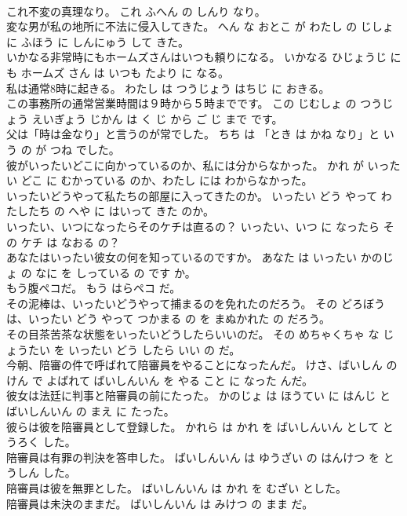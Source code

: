 \documentclass[8pt]{extreport}
\begin{document}
\begin{CJK}{UTF8}{min}
\\	これ不変の真理なり。	これ ふへん の しんり なり。	
\\	変な男が私の地所に不法に侵入してきた。	へん な おとこ が わたし の じしょ に ふほう に しんにゅう して きた。	
\\	いかなる非常時にもホームズさんはいつも頼りになる。	いかなる ひじょうじ にも ホームズ さん は いつも たより に なる。	
\\	私は通常8時に起きる。	わたし は つうじょう はちじ に おきる。	
\\	この事務所の通常営業時間は９時から５時までです。	この じむしょ の つうじょう えいぎょう じかん は く じ から ご じ まで です。	
\\	父は「時は金なり」と言うのが常でした。	ちち は 「とき は かね なり」と いう の が つね でした。	
\\	彼がいったいどこに向かっているのか、私には分からなかった。	かれ が いったい どこ に むかっている のか、わたし には わからなかった。	
\\	いったいどうやって私たちの部屋に入ってきたのか。	いったい どう やって わたしたち の へや に はいって きた のか。	
\\	いったい、いつになったらそのケチは直るの？	いったい、いつ に なったら その ケチ は なおる の？	
\\	あなたはいったい彼女の何を知っているのですか。	あなた は いったい かのじょ の なに を しっている の です か。	
\\	もう腹ペコだ。	もう はらペコ だ。	
\\	その泥棒は、いったいどうやって捕まるのを免れたのだろう。	その どろぼう は、いったい どう やって つかまる の を まぬかれた の だろう。	
\\	その目茶苦茶な状態をいったいどうしたらいいのだ。	その めちゃくちゃ な じょうたい を いったい どう したら いい の だ。	
\\	今朝、陪審の件で呼ばれて陪審員をやることになったんだ。	けさ、ばいしん の けん で よばれて ばいしんいん を やる こと に なった んだ。	
\\	彼女は法廷に判事と陪審員の前にたった。	かのじょ は ほうてい に はんじ と ばいしんいん の まえ に たった。	
\\	彼らは彼を陪審員として登録した。	かれら は かれ を ばいしんいん として とうろく した。	
\\	陪審員は有罪の判決を答申した。	ばいしんいん は ゆうざい の はんけつ を とうしん した。	
\\	陪審員は彼を無罪とした。	ばいしんいん は かれ を むざい とした。	
\\	陪審員は未決のままだ。	ばいしんいん は みけつ の まま だ。	

\end{CJK}
\end{document}
